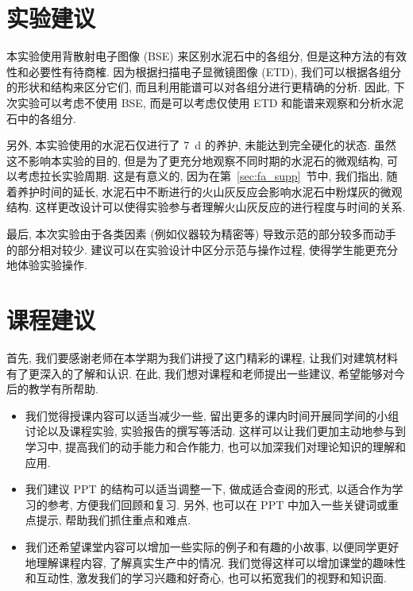 
\section{实验建议}

本实验使用背散射电子图像 (BSE) 来区别水泥石中的各组分, 但是这种方法的有效性和必要性有待商榷.
因为根据扫描电子显微镜图像 (ETD), 我们可以根据各组分的形状和结构来区分它们, 而且利用能谱可以对各组分进行更精确的分析.
因此, 下次实验可以考虑不使用 BSE, 而是可以考虑仅使用 ETD 和能谱来观察和分析水泥石中的各组分.

另外, 本实验使用的水泥石仅进行了 \SI{7}{\day} 的养护, 未能达到完全硬化的状态.
虽然这不影响本实验的目的, 但是为了更充分地观察不同时期的水泥石的微观结构, 可以考虑拉长实验周期. 这是有意义的, 因为在第~\ref{sec:fa_supp}~节中, 我们指出, 随着养护时间的延长, 水泥石中不断进行的火山灰反应会影响水泥石中粉煤灰的微观结构. 这样更改设计可以使得实验参与者理解火山灰反应的进行程度与时间的关系.

最后, 本次实验由于各类因素 (例如仪器较为精密等) 导致示范的部分较多而动手的部分相对较少.
建议可以在实验设计中区分示范与操作过程, 使得学生能更充分地体验实验操作.

\section{课程建议}


首先, 我们要感谢老师在本学期为我们讲授了这门精彩的课程, 让我们对建筑材料有了更深入的了解和认识.
在此, 我们想对课程和老师提出一些建议, 希望能够对今后的教学有所帮助.

\begin{itemize}
  \item 我们觉得授课内容可以适当减少一些, 留出更多的课内时间开展同学间的小组讨论以及课程实验, 实验报告的撰写等活动.
        这样可以让我们更加主动地参与到学习中, 提高我们的动手能力和合作能力, 也可以加深我们对理论知识的理解和应用.
  \item 我们建议 PPT 的结构可以适当调整一下, 做成适合查阅的形式, 以适合作为学习的参考, 方便我们回顾和复习.
        另外, 也可以在 PPT 中加入一些关键词或重点提示, 帮助我们抓住重点和难点.
  \item 我们还希望课堂内容可以增加一些实际的例子和有趣的小故事, 以便同学更好地理解课程内容, 了解真实生产中的情况.
        我们觉得这样可以增加课堂的趣味性和互动性, 激发我们的学习兴趣和好奇心, 也可以拓宽我们的视野和知识面.
\end{itemize}

